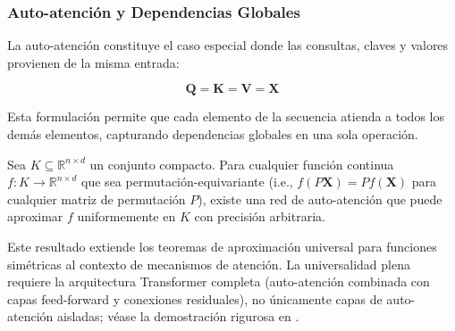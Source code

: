 \subsubsection{Auto-atención y Dependencias Globales}

La auto-atención constituye el caso especial donde las consultas, claves y valores provienen de la misma entrada:

\begin{equation}
    \mathbf{Q} = \mathbf{K} = \mathbf{V} = \mathbf{X}
    \label{eq:self_attention_case}
\end{equation}

Esta formulación permite que cada elemento de la secuencia atienda a todos los demás elementos, capturando dependencias globales en una sola operación.

\begin{theorem}\label{theorem:self_attention_universality}
    Sea $K \subseteq \mathbb{R}^{n \times d}$ un conjunto compacto. Para cualquier función continua 
    $f: K \to \mathbb{R}^{n \times d}$ que sea permutación-equivariante (i.e., $f(P\mathbf{X}) = Pf(\mathbf{X})$ 
    para cualquier matriz de permutación $P$), existe una red de auto-atención que puede aproximar 
    $f$ uniformemente en $K$ con precisión arbitraria.
    
    Este resultado extiende los teoremas de aproximación universal para funciones simétricas
    \citep{zaheer2017deepsets} al contexto de mecanismos de atención. La universalidad plena requiere la arquitectura Transformer completa (auto-atención combinada con capas feed-forward y conexiones residuales), no únicamente capas de auto-atención aisladas; véase la demostración rigurosa en \citet{yun2020transformers}.
\end{theorem}

